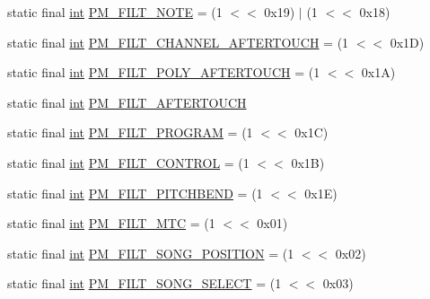 \begin{DoxyCompactItemize}
\item 
static final \hyperlink{xmltok_8h_a5a0d4a5641ce434f1d23533f2b2e6653}{int} \hyperlink{classjportmidi_1_1_j_port_midi_api_a5c49dbdc802059a30a90794e65560fb5}{P\+M\+\_\+\+F\+I\+L\+T\+\_\+\+N\+O\+TE} = (1 $<$$<$ 0x19) $\vert$ (1 $<$$<$ 0x18)
\item 
static final \hyperlink{xmltok_8h_a5a0d4a5641ce434f1d23533f2b2e6653}{int} \hyperlink{classjportmidi_1_1_j_port_midi_api_acec7f9f30be5f5b1b3e1361ff1c8031d}{P\+M\+\_\+\+F\+I\+L\+T\+\_\+\+C\+H\+A\+N\+N\+E\+L\+\_\+\+A\+F\+T\+E\+R\+T\+O\+U\+CH} = (1 $<$$<$ 0x1\+D)
\item 
static final \hyperlink{xmltok_8h_a5a0d4a5641ce434f1d23533f2b2e6653}{int} \hyperlink{classjportmidi_1_1_j_port_midi_api_a4fa4256dcbf1253c1c0907cf4d90c5e9}{P\+M\+\_\+\+F\+I\+L\+T\+\_\+\+P\+O\+L\+Y\+\_\+\+A\+F\+T\+E\+R\+T\+O\+U\+CH} = (1 $<$$<$ 0x1\+A)
\item 
static final \hyperlink{xmltok_8h_a5a0d4a5641ce434f1d23533f2b2e6653}{int} \hyperlink{classjportmidi_1_1_j_port_midi_api_a48c81d67b7ab4206d466cf1196d87bd7}{P\+M\+\_\+\+F\+I\+L\+T\+\_\+\+A\+F\+T\+E\+R\+T\+O\+U\+CH}
\item 
static final \hyperlink{xmltok_8h_a5a0d4a5641ce434f1d23533f2b2e6653}{int} \hyperlink{classjportmidi_1_1_j_port_midi_api_a492554536a39aef44801661c57530215}{P\+M\+\_\+\+F\+I\+L\+T\+\_\+\+P\+R\+O\+G\+R\+AM} = (1 $<$$<$ 0x1\+C)
\item 
static final \hyperlink{xmltok_8h_a5a0d4a5641ce434f1d23533f2b2e6653}{int} \hyperlink{classjportmidi_1_1_j_port_midi_api_a3f7d26496141fa51beedda723392b574}{P\+M\+\_\+\+F\+I\+L\+T\+\_\+\+C\+O\+N\+T\+R\+OL} = (1 $<$$<$ 0x1\+B)
\item 
static final \hyperlink{xmltok_8h_a5a0d4a5641ce434f1d23533f2b2e6653}{int} \hyperlink{classjportmidi_1_1_j_port_midi_api_a84200fe15d7de5556c70d61feedc9cb4}{P\+M\+\_\+\+F\+I\+L\+T\+\_\+\+P\+I\+T\+C\+H\+B\+E\+ND} = (1 $<$$<$ 0x1\+E)
\item 
static final \hyperlink{xmltok_8h_a5a0d4a5641ce434f1d23533f2b2e6653}{int} \hyperlink{classjportmidi_1_1_j_port_midi_api_a33f04e9c4975dbf77745300850fed838}{P\+M\+\_\+\+F\+I\+L\+T\+\_\+\+M\+TC} = (1 $<$$<$ 0x01)
\item 
static final \hyperlink{xmltok_8h_a5a0d4a5641ce434f1d23533f2b2e6653}{int} \hyperlink{classjportmidi_1_1_j_port_midi_api_a44570b5ed5fa9136061e974c17fdb6b4}{P\+M\+\_\+\+F\+I\+L\+T\+\_\+\+S\+O\+N\+G\+\_\+\+P\+O\+S\+I\+T\+I\+ON} = (1 $<$$<$ 0x02)
\item 
static final \hyperlink{xmltok_8h_a5a0d4a5641ce434f1d23533f2b2e6653}{int} \hyperlink{classjportmidi_1_1_j_port_midi_api_a492ba21b711bb71813900d0c7848f6b3}{P\+M\+\_\+\+F\+I\+L\+T\+\_\+\+S\+O\+N\+G\+\_\+\+S\+E\+L\+E\+CT} = (1 $<$$<$ 0x03)

\end{DoxyCompactItemize}
